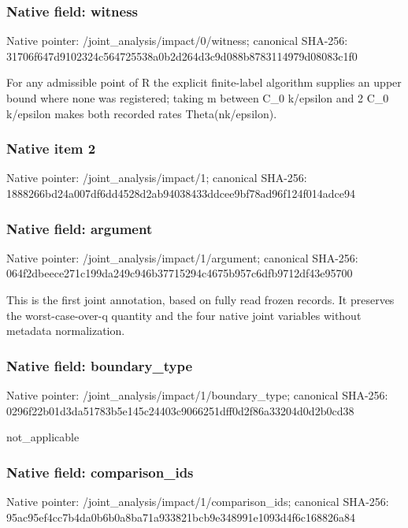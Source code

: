 \documentclass[10pt,a4paper]{article}
\begin{document}
\subsubsection{Native field: witness}
Native pointer: /joint\_\allowbreak{}analysis/impact/0/witness; canonical SHA-256: 31706f647d9102324c564725538a0b2d264d3c9d088b8783114979d08083c1f0

\begingroup\raggedright\sloppy For any admissible point of R the explicit finite-label algorithm supplies an upper bound where none was registered;\allowbreak{} taking m between C\_\allowbreak{}0 k/\allowbreak{}epsilon and 2 C\_\allowbreak{}0 k/\allowbreak{}epsilon makes both recorded rates Theta(nk/\allowbreak{}epsilon).\par\endgroup

\subsubsection{Native item 2}
Native pointer: /joint\_\allowbreak{}analysis/impact/1; canonical SHA-256: 1888266bd24a007df6dd4528d2ab94038433ddcee9bf78ad96f124f014adce94

\subsubsection{Native field: argument}
Native pointer: /joint\_\allowbreak{}analysis/impact/1/argument; canonical SHA-256: 064f2dbeece271c199da249c946b37715294c4675b957c6dfb9712df43e95700

\begingroup\raggedright\sloppy This is the first joint annotation,\allowbreak{} based on fully read frozen records. It preserves the worst-case-over-q quantity and the four native joint variables without metadata normalization.\par\endgroup

\subsubsection{Native field: boundary\_\allowbreak{}type}
Native pointer: /joint\_\allowbreak{}analysis/impact/1/boundary\_\allowbreak{}type; canonical SHA-256: 0296f22b01d3da51783b5e145c24403c9066251dff0d2f86a33204d0d2b0cd38

\begingroup\raggedright\sloppy not\_\allowbreak{}applicable\par\endgroup

\subsubsection{Native field: comparison\_\allowbreak{}ids}
Native pointer: /joint\_\allowbreak{}analysis/impact/1/comparison\_\allowbreak{}ids; canonical SHA-256: 95ac95ef4cc7b4da0b6b0a8ba71a933821bcb9e348991e1093d4f6c168826a84
\end{document}

